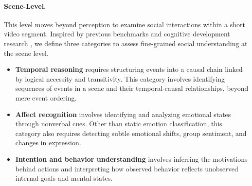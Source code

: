 \paragraph{Scene-Level.} This level moves beyond perception to examine social interactions within a short video segment. Inspired by previous benchmarks \cite{xiao2021next, siq2} and cognitive development research \cite{burris2014all}, we define three categories to assess fine-grained social understanding at the scene level.
\begin{itemize}[noitemsep,topsep=0pt,nosep,leftmargin=*,parsep=0pt,partopsep=0pt]
    \item \textbf{Temporal reasoning} \cite{trabasso1989logical} requires structuring events into a causal chain linked by logical necessity and transitivity. This category involves identifying sequences of events in a scene and their temporal-causal relationships, beyond mere event ordering.
    \item \textbf{Affect recognition} \cite{pantic2003toward} involves identifying and analyzing emotional states through nonverbal cues. Other than static emotion classification, this category also requires detecting subtle emotional shifts, group sentiment, and changes in expression.
    \item \textbf{Intention and behavior understanding} \cite{blakemore2001perception} involves inferring the motivations behind actions and interpreting how observed behavior reflects unobserved internal goals and mental states.
\end{itemize}

